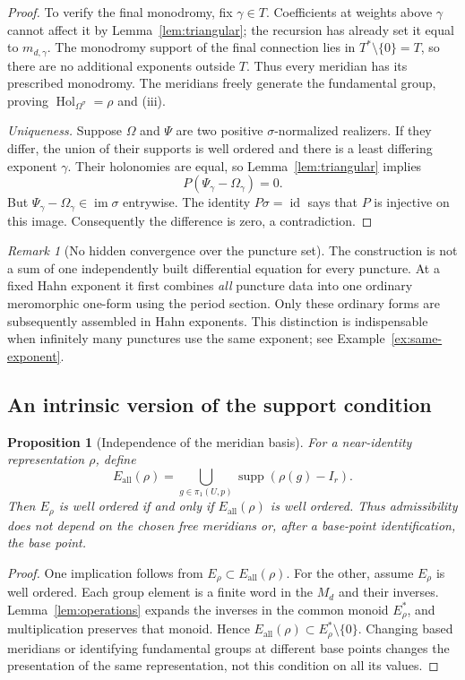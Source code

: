 \documentclass[11pt,letterpaper]{article}
\numberwithin{equation}{section}
\newtheorem{proposition}[theorem]{Proposition}
\theoremstyle{definition}
\theoremstyle{remark}
\newtheorem{remark}[theorem]{Remark}
\newcommand{\supp}{\operatorname{supp}}
\newcommand{\Hol}{\operatorname{Hol}}
\newcommand{\id}{\operatorname{id}}
\newcommand{\im}{\operatorname{im}}
\begin{document}
\begin{proof}
To verify the final monodromy, fix $\gamma\in T$. Coefficients at weights
above $\gamma$ cannot affect it by Lemma~\ref{lem:triangular}; the recursion
has already set it equal to $m_{d,\gamma}$. The monodromy support of the
final connection lies in $T^*\setminus\{0\}=T$, so there are no additional
exponents outside $T$. Thus every meridian has its prescribed monodromy.
The meridians freely generate the fundamental group, proving
$\Hol_{\Omega^\sigma}=\rho$ and (iii).

\emph{Uniqueness.} Suppose $\Omega$ and $\Psi$ are two positive
$\sigma$-normalized realizers. If they differ, the union of their supports
is well ordered and there is a least differing exponent $\gamma$.
Their holonomies are equal, so Lemma~\ref{lem:triangular} implies
\[
 P(\Psi_\gamma-\Omega_\gamma)=0.
\]
But $\Psi_\gamma-\Omega_\gamma\in\im\sigma$ entrywise. The identity
$P\sigma=\id$ says that $P$ is injective on this image. Consequently the
difference is zero, a contradiction.
\end{proof}

\begin{remark}[No hidden convergence over the puncture set]
The construction is not a sum of one independently built differential
equation for every puncture. At a fixed Hahn exponent it first combines
\emph{all} puncture data into one ordinary meromorphic one-form using the
period section. Only these ordinary forms are subsequently assembled in
Hahn exponents. This distinction is indispensable when infinitely many
punctures use the same exponent; see Example~\ref{ex:same-exponent}.
\end{remark}

\subsection{An intrinsic version of the support condition}

\begin{proposition}[Independence of the meridian basis]\label{prop:intrinsic}
For a near-identity representation $\rho$, define
\[
 E_{\mathrm{all}}(\rho)=
 \bigcup_{g\in\pi_1(U,p)}\supp(\rho(g)-I_r).
\]
Then $E_\rho$ is well ordered if and only if
$E_{\mathrm{all}}(\rho)$ is well ordered. Thus admissibility does not depend
on the chosen free meridians or, after a base-point identification, the base
point.
\end{proposition}
\begin{proof}
One implication follows from $E_\rho\subset E_{\mathrm{all}}(\rho)$.
For the other, assume $E_\rho$ is well ordered. Each group element is a
finite word in the $M_d$ and their inverses. Lemma~\ref{lem:operations}
expands the inverses in the common monoid $E_\rho^*$, and multiplication
preserves that monoid. Hence
$E_{\mathrm{all}}(\rho)\subset E_\rho^*\setminus\{0\}$.
Changing based meridians or identifying fundamental groups at different
base points changes the presentation of the same representation, not this
condition on all its values.
\end{proof}
\end{document}
